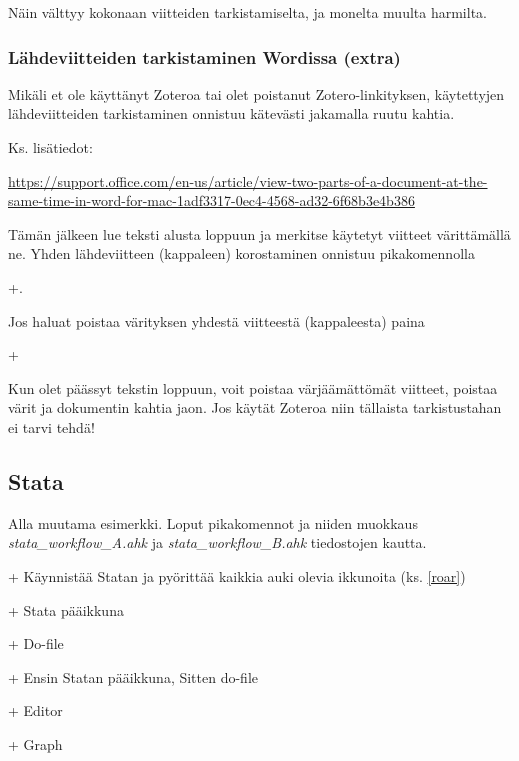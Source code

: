 \documentclass[a4paper,12pt]{scrartcl}
\begin{document}

Näin välttyy kokonaan viitteiden tarkistamiselta, ja monelta muulta harmilta.

\subsubsection{Lähdeviitteiden tarkistaminen Wordissa (extra)}
Mikäli et ole käyttänyt Zoteroa tai olet poistanut Zotero-linkityksen, käytettyjen lähdeviitteiden tarkistaminen onnistuu kätevästi jakamalla ruutu kahtia.



Ks. lisätiedot:

\url{https://support.office.com/en-us/article/view-two-parts-of-a-document-at-the-same-time-in-word-for-mac-1adf3317-0ec4-4568-ad32-6f68b3e4b386}

Tämän jälkeen lue teksti alusta loppuun ja merkitse käytetyt viitteet värittämällä ne. Yhden lähdeviitteen (kappaleen) korostaminen onnistuu pikakomennolla

+. 

Jos haluat poistaa värityksen yhdestä viitteestä (kappaleesta) paina

+

Kun olet päässyt tekstin loppuun, voit poistaa värjäämättömät viitteet, poistaa värit ja dokumentin kahtia jaon. Jos käytät Zoteroa niin tällaista tarkistustahan ei tarvi tehdä!

\subsection{Stata}

Alla muutama esimerkki. Loput pikakomennot ja niiden muokkaus \emph{stata\_workflow\_A.ahk} ja \emph{stata\_workflow\_B.ahk} tiedostojen kautta.

\medskip

+ Käynnistää Statan ja pyörittää kaikkia auki olevia ikkunoita (ks. \ref{roar})

+ Stata pääikkuna

+\keys{\shift} Do-file

+\keys{\textgreater} Ensin Statan pääikkuna, Sitten do-file

+ Editor

+ Graph
\end{document}

